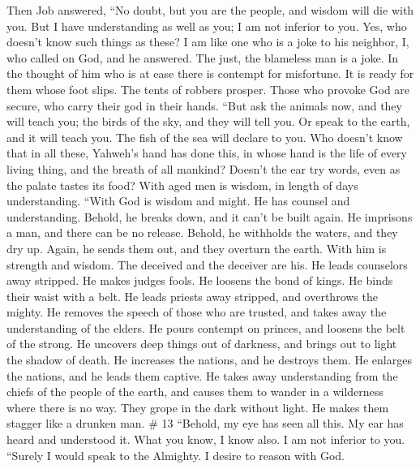  Then Job answered,  ``No doubt, but you are the
people, and wisdom will die with you.  But I have
understanding as well as you; I am not inferior to you. Yes, who doesn't
know such things as these?  I am like one who is a joke to
his neighbor, I, who called on God, and he answered. The just, the
blameless man is a joke.  In the thought of him who is at
ease there is contempt for misfortune. It is ready for them whose foot
slips.  The tents of robbers prosper. Those who provoke God
are secure, who carry their god in their hands.  ``But ask
the animals now, and they will teach you; the birds of the sky, and they
will tell you.  Or speak to the earth, and it will teach
you. The fish of the sea will declare to you.  Who doesn't
know that in all these, Yahweh's hand has done this,  in
whose hand is the life of every living thing, and the breath of all
mankind?  Doesn't the ear try words, even as the palate
tastes its food?  With aged men is wisdom, in length of
days understanding.  ``With God is wisdom and might. He has
counsel and understanding.  Behold, he breaks down, and it
can't be built again. He imprisons a man, and there can be no release.
 Behold, he withholds the waters, and they dry up. Again,
he sends them out, and they overturn the earth.  With him
is strength and wisdom. The deceived and the deceiver are his.
 He leads counselors away stripped. He makes judges fools.
 He loosens the bond of kings. He binds their waist with a
belt.  He leads priests away stripped, and overthrows the
mighty.  He removes the speech of those who are trusted,
and takes away the understanding of the elders.  He pours
contempt on princes, and loosens the belt of the strong. 
He uncovers deep things out of darkness, and brings out to light the
shadow of death.  He increases the nations, and he destroys
them. He enlarges the nations, and he leads them captive. 
He takes away understanding from the chiefs of the people of the earth,
and causes them to wander in a wilderness where there is no way.
 They grope in the dark without light. He makes them
stagger like a drunken man. \# 13  ``Behold, my eye has seen
all this. My ear has heard and understood it.  What you
know, I know also. I am not inferior to you.  ``Surely I
would speak to the Almighty. I desire to reason with God. 
